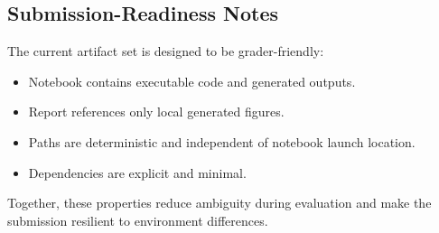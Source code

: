 \subsection{Submission-Readiness Notes}

The current artifact set is designed to be grader-friendly:
\begin{itemize}
    \item Notebook contains executable code and generated outputs.
    \item Report references only local generated figures.
    \item Paths are deterministic and independent of notebook launch location.
    \item Dependencies are explicit and minimal.
\end{itemize}

Together, these properties reduce ambiguity during evaluation and make the submission resilient to environment differences.
